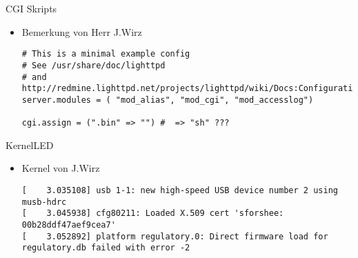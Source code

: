 \documentclass{beamer}
\begin{document}
\begin{frame}[fragile]{CGI Skripts}
 \begin{itemize}
  \item Bemerkung von Herr J.Wirz
{\tiny
\begin{verbatim}
# This is a minimal example config
# See /usr/share/doc/lighttpd
# and http://redmine.lighttpd.net/projects/lighttpd/wiki/Docs:ConfigurationOptions
server.modules = ( "mod_alias", "mod_cgi", "mod_accesslog")

cgi.assign = (".bin" => "") #  => "sh" ???
\end{verbatim}
}
 \end{itemize}
\end{frame}

\begin{frame}[fragile]{Kernel}{LED}
\begin{itemize}
 \item Kernel von J.Wirz
 {\tiny
  \begin{verbatim}
[    3.035108] usb 1-1: new high-speed USB device number 2 using musb-hdrc
[    3.045938] cfg80211: Loaded X.509 cert 'sforshee: 00b28ddf47aef9cea7'
[    3.052892] platform regulatory.0: Direct firmware load for regulatory.db failed with error -2
  \end{verbatim}
 }
\end{itemize}
\end{frame}
\end{document}

